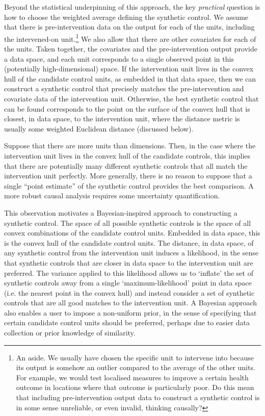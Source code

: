 \documentclass[a4paper, 12pt, onecolumn, singlepage]{article}
\begin{document}
Beyond the statistical underpinning of this approach,
the key \emph{practical} question is how to choose the weighted average defining the synthetic control.
We assume that there is pre-intervention data on the output for each of the units, including the intervened-on unit.\footnote{
	An aside.
	We usually have chosen the specific unit to intervene into
	because its output is somehow an outlier compared to the average of the other units.
	For example, we would test localised measures to improve a certain health outcome 
	in locations where that outcome is particularly poor.
	Do this mean that including pre-intervention output data to construct a synthetic control
	is in some sense unreliable, or even invalid, thinking causally? 
}
We also allow that there are other covariates for each of the units.
Taken together, the covariates and the pre-intervention output provide a data space,
and each unit corresponds to a single observed point in this (potentially high-dimensional) space.
If the intervention unit lives in the convex hull of the candidate control units,
as embedded in that data space,
then we can construct a synthetic control
that precisely matches the pre-intervention and covariate data of the intervention unit.
Otherwise, the best synthetic control that can be found
corresponds to the point on the surface of the convex hull
that is closest, in data space, to the intervention unit,
where the distance metric is usually some weighted Euclidean distance (discussed below).

Suppose that there are more units than dimensions.
Then, in the case where the intervention unit lives in the convex hull of the candidate controls,
this implies that there are potentially many different synthetic controls that all match the intervention unit perfectly.
More generally, there is no reason to suppose that a single ``point estimate'' of the synthetic control provides the best comparison.
A more robust causal analysis requires some uncertainty quantification.

This observation motivates a Bayesian-inspired approach to constructing a synthetic control.
The space of all possible synthetic controls is the space of all convex combinations of the candidate control units.
Embedded in data space, this is the convex hull of the candidate control units.
The distance, in data space, of any synthetic control from the intervention unit induces a likelihood,
in the sense that synthetic controls that are closer in data space to the intervention unit are preferred.
The variance applied to this likelihood allows us to `inflate' the set of synthetic controls
away from a single `maximum-likelihood' point in data space
(i.e. the nearest point in the convex hull)
and instead consider a set of synthetic controls that are all good matches to the intervention unit.
A Bayesian approach also enables a user to impose a non-uniform prior,
in the sense of specifying that certain candidate control units should be preferred,
perhaps due to easier data collection or prior knowledge of similarity.
\end{document}
